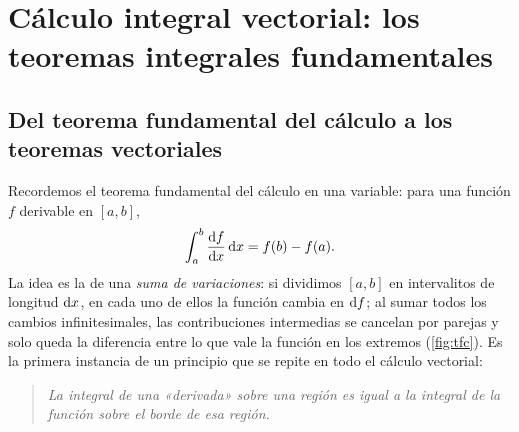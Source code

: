 \section{Cálculo integral vectorial: los teoremas integrales fundamentales}\label{sec:integral}

\subsection{Del teorema fundamental del cálculo a los teoremas vectoriales}\label{sec:tfc}
Recordemos el teorema fundamental del cálculo en una variable: para una
función $f$ derivable en $[a,b]$,
\begin{equation}\label{eq:tfc}
  \int_{a}^{b}\frac{\mathrm{d} f}{\mathrm{d} x}\,\mathrm{d} x=f(b)-f(a).
\end{equation}
La idea es la de una \emph{suma de variaciones}: si dividimos $[a,b]$ en
intervalitos de longitud $\mathrm{d} x$, en cada uno de ellos la función cambia en
$\mathrm{d} f$; al sumar todos los cambios infinitesimales, las contribuciones
intermedias se cancelan por parejas y solo queda la diferencia entre lo que
vale la función en los extremos (\cref{fig:tfc}). Es la primera instancia de un
principio que se repite en todo el cálculo vectorial:

\begin{quote}\itshape
La integral de una «derivada» sobre una región es igual a la integral de la
función sobre el borde de esa región.
\end{quote}

